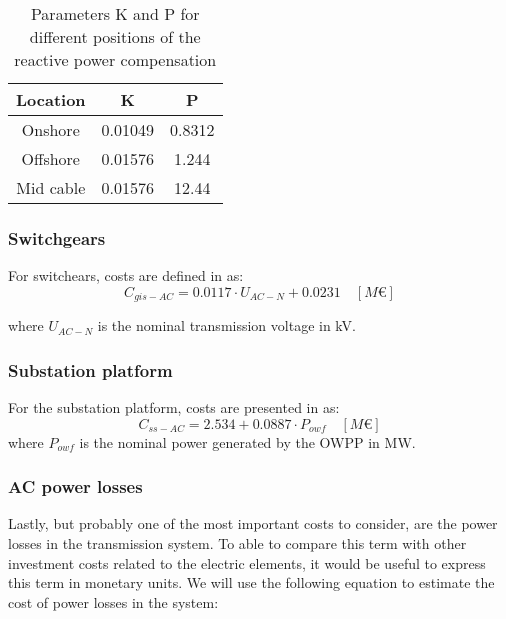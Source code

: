 \documentclass[a4paper,11pt, titlepage, twoside]{article}
\begin{document}
\begin{table}[H]
    \centering
    \begin{tabular}{c|c|c}
    \hline
    \textbf{Location} & \textbf{K} & \textbf{P} \\
    \hline
    Onshore & 0.01049 & 0.8312  \\
    Offshore & 0.01576 & 1.244 \\
    Mid cable & 0.01576 & 12.44 \\
    \hline
    \end{tabular}
    \caption{Parameters K and P for different positions of the reactive power compensation \cite{paperbase}}
    \label{tab:parametersshunt}
    \end{table}
\subsubsection{Switchgears}

For switchears, costs are defined in \cite{switchcost} as:
\begin{equation}
    C_{gis-AC} = 0.0117 \cdot U_{AC-N} + 0.0231 \quad \left[M\euro\right]
\end{equation}

where $U_{AC-N}$ is the nominal transmission voltage in kV.
\subsubsection{Substation platform}
For the substation platform, costs are presented in \cite{chalmers} as:
\begin{equation}
    C_{ss-AC} = 2.534 + 0.0887 \cdot P_{owf} \quad \left[M\euro\right]
\end{equation}
where $P_{owf}$ is the nominal power generated by the OWPP in MW.

\subsubsection{AC power losses}
Lastly, but probably one of the most important costs to consider, are the power losses in the transmission system. To able to compare this term with other investment costs related to the electric elements,
it would be useful to express this term in monetary units. We will use the following equation to estimate the cost of power losses in the system:
\end{document}
